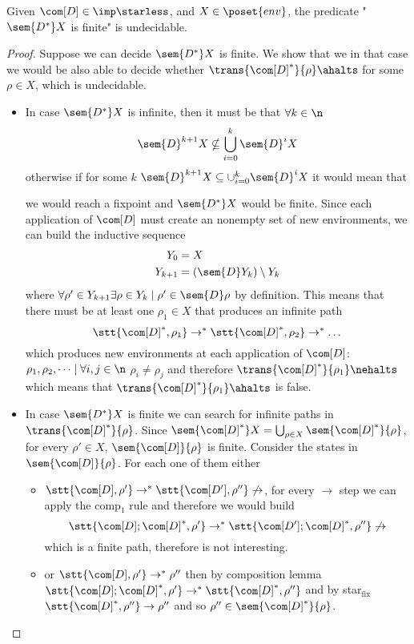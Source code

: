 \begin{lemma}\label{le:infiniteness}
  Given \(\com[D]\in\imp\starless\), and \(X \in \poset{env}\), the
  predicate "\(\sem{D^*}X\) is finite" is undecidable.
\end{lemma}

\begin{proof}
  Suppose we can decide \(\sem{D^*}X\) is finite. We show that we in
  that case we would be also able to decide whether
  \(\trans{\com[D]^*}{\rho}\ahalts\) for some \(\rho \in X\), which is
  undecidable.%
  \begin{itemize}
  \item In case \(\sem{D^*}X\) is infinite, then it must be that
    \(\forall k \in \n\)
    \[\sem{D}^{k+1}X \nsubseteq \bigcup_{i=0}^k\sem{D}^iX\] otherwise if
    for some \(k\) \(\sem{D}^{k+1}X \subseteq \cup_{i=0}^k\sem{D}^iX\)
    it would mean that 


    we
    would reach a fixpoint and \(\sem{D^*}X\) would be finite. Since
    each application of \(\com[D]\) must create an nonempty set of new
    environments, we can build the inductive sequence
    \begin{align*}
      Y_0 & = X \\
      Y_{k+1} & = (\sem{D}Y_k)\setminus Y_k
    \end{align*}
    where
    \(\forall \rho' \in Y_{k+1} \exists \rho \in Y_k \mid \rho' \in
    \sem{D}\rho\) by definition. This means that there must be at
    least one \(\rho_1\in X\) that produces an infinite path
    \[\stt{\com[D]^*, \rho_1}\to^*\stt{\com[D]^*, \rho_2}\to^*\dots \]
    which produces new environments at each application of
    \(\com[D]\): \(\rho_1, \rho_2, \dots \mid \forall i,j \in \n\)
    \(\rho_i \neq \rho_j\) and therefore
    \(\trans{\com[D]^*}{\rho_1} \nehalts\) which means that
    \(\trans{\com[D]^*}{\rho_1}\ahalts\) is false.
  \item In case \(\sem{D^*}X\) is finite we can search for infinite
    paths in \(\trans{\com[D]^*}{\rho}\). Since
    \(\sem{\com[D]^*}X = \bigcup_{\rho\in X}\sem{\com[D]^*}\{\rho\}\),
    for every \(\rho' \in X\), \(\sem{\com[D]}\{\rho\}\) is
    finite. Consider the states in \(\sem{\com[D]}\{\rho\}\). For each
    one of them either
    \begin{itemize}
    \item
      \(\stt{\com[D], \rho'} \to^* \stt{\com[D'], \rho''} \not\to\),
      for every \(\to\) step we can apply the comp\(_1\) rule and
      therefore we would build
      \[\stt{\com[D];\com[D]^*, \rho'} \to^* \stt{\com[D']; \com[D]^*,
          \rho''} \not\to\] which is a finite path, therefore is not
      interesting.
    \item or \(\stt{\com[D], \rho'} \to^* \rho''\) then by composition
      lemma
      \(\stt{\com[D]; \com[D]^*, \rho'} \to^* \stt{\com[D]^*,
        \rho''}\) and by star\(_{\text{fix}}\)
      \(\stt{\com[D]^*, \rho''} \to \rho''\) and so
      \(\rho'' \in \sem{\com[D]^*}\{\rho\}\).
    \end{itemize}
  \end{itemize}
\end{proof}
